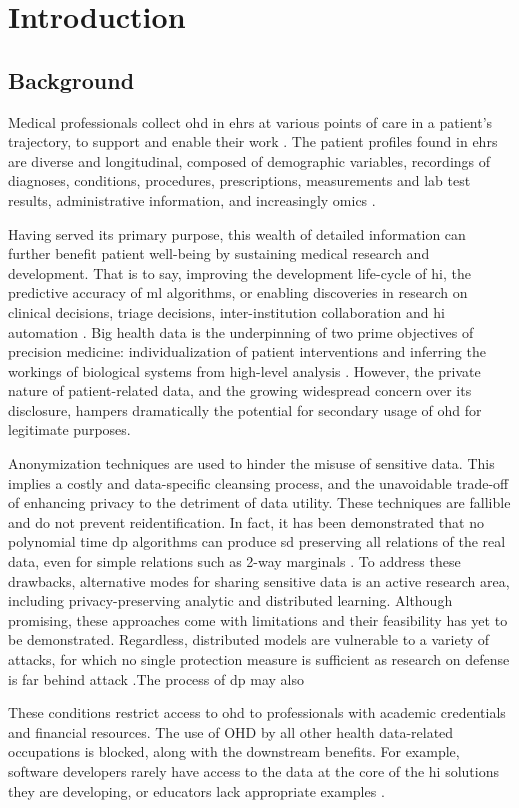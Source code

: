\glsresetall
\section{Introduction}
    \subsection{Background}
        Medical professionals collect \gls{ohd} in \glspl{ehr} at various points of care in a patient’s trajectory, to support and enable their work \cite{Cowie_2016}. The patient profiles found in \glspl{ehr} are diverse and longitudinal, composed of demographic variables, recordings of diagnoses, conditions, procedures, prescriptions, measurements and lab test results, administrative information, and increasingly omics \cite{Ohdsi2020-vf}.\par
        Having served its primary purpose, this wealth of detailed information can further benefit patient well-being by sustaining medical research and development. That is to say, improving the development life-cycle of \gls{hi}, the predictive accuracy of \gls{ml} algorithms, or enabling discoveries in research on clinical decisions, triage decisions, inter-institution collaboration and \gls{hi} automation \cite{Rudin_2020, Rankin2020}. Big health data is the underpinning of two prime objectives of precision medicine: individualization of patient interventions and inferring the workings of biological systems from high-level analysis \cite{Capobianco2020}. However, the private nature of patient-related data, and the growing widespread concern over its disclosure, hampers dramatically the potential for secondary usage of \gls{ohd} for legitimate purposes.\par
        
        Anonymization techniques are used to hinder the misuse of sensitive data. This implies a costly and data-specific cleansing process, and the unavoidable trade-off of enhancing privacy to the detriment of data utility.  These techniques are fallible and do not prevent reidentification. In fact, it has been demonstrated that no polynomial time \gls{dp} algorithms can produce \gls{sd} preserving all relations of the real data, even for simple relations such as 2-way marginals \cite{Ullman2011}. To address these drawbacks, alternative modes for sharing sensitive data is an active research area, including privacy-preserving analytic and distributed learning. Although promising, these approaches come with limitations and their feasibility has yet to be demonstrated. Regardless, distributed models are vulnerable to a variety of attacks, for which no single protection measure is sufficient as research on defense is far behind attack \cite{enthoven2020overview, Gao2020}.The process of \gls{dp} may also \par
        These conditions restrict access to \gls{ohd} to professionals with academic credentials and financial resources. The use of OHD by all other health data-related occupations is blocked, along with the downstream benefits. For example, software developers rarely have access to the data at the core of the \gls{hi} solutions they are developing, or educators lack appropriate examples \cite{laderas_teaching_2018}.
        
